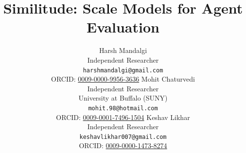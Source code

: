 \documentclass[11pt]{article}
\title{Similitude: Scale Models for Agent Evaluation}
\author{Harsh Mandalgi \\
  {\small Independent Researcher} \\
  {\small\texttt{harshmandalgi@gmail.com}} \\
  {\small ORCID: \href{https://orcid.org/0009-0000-9956-3636}{0009-0000-9956-3636}}
  \And
  Mohit Chaturvedi \\
  {\small Independent Researcher} \\
  {\small University at Buffalo (SUNY)} \\
  {\small\texttt{mohit.98@hotmail.com}} \\
  {\small ORCID: \href{https://orcid.org/0009-0001-7496-1504}{0009-0001-7496-1504}}
  \And
  Keshav Likhar \\
  {\small Independent Researcher} \\
  {\small\texttt{keshavlikhar007@gmail.com}} \\
  {\small ORCID: \href{https://orcid.org/0009-0000-1473-8274}{0009-0000-1473-8274}}}
\begin{document}
\maketitle

\begin{abstract}

\end{abstract}













\appendix

\end{document}
